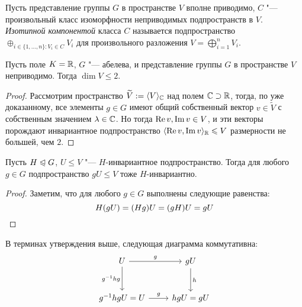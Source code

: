 \begin{definition}
	Пусть представление группы $G$ в пространстве $V$ вполне приводимо, $C$ "--- произвольный класс изоморфности неприводимых подпространств в $V$. \textit{Изотипной компонентой} класса $C$ называется подпространство $\oplus_{i \in \{1, \dotsc, n\} : V_i \in C}V_i$ для произвольного разложения $V = \bigoplus_{i = 1}^nV_i$.
\end{definition}

\begin{proposition}
	Пусть поле $K = \mathbb{R}$, $G$ "--- абелева, и представление группы $G$ в пространстве $V$ неприводимо. Тогда $\dim {V} \le 2$.
\end{proposition}

\begin{proof}
	Рассмотрим пространство $\widetilde V := \langle V\rangle_{\mathbb{C}}$ над полем $\mathbb{C} \supset \mathbb{R}$, тогда, по уже доказанному, все элементы $g \in G$ имеют общий собственный вектор $v \in \widetilde V$ с собственным значением $\lambda \in \mathbb{C}$. Но тогда $\operatorname{Re}{v}, \operatorname{Im}{v} \in V$, и эти векторы порождают инвариантное подпространство $\langle \operatorname{Re}{v}, \operatorname{Im}{v}\rangle_{\mathbb{R}} \leqslant V$ размерности не большей, чем $2$.
\end{proof}

\begin{proposition}
	Пусть $H \trianglelefteqslant G$, $U \le V$ "--- $H$-инвариантное подпространство. Тогда для любого $g \in G$ подпространство $gU \le V$ тоже $H$-инвариантно.
\end{proposition}

\begin{proof}
	Заметим, что для любого $g \in G$ выполнены следующие равенства:
	\[H(gU) = (Hg)U = (gH)U = gU\qedhere\]
\end{proof}

\begin{note}
	В терминах утверждения выше, следующая диаграмма коммутативна:
	\[
	\begin{tikzcd}[row sep = large]
		U \arrow[swap]{d}{g^{-1}hg} \arrow{r}{g} & gU \arrow{d}{h}\\
		g^{-1}hgU = U \arrow{r}{g} & hgU = gU
	\end{tikzcd}
	\]
\end{note}